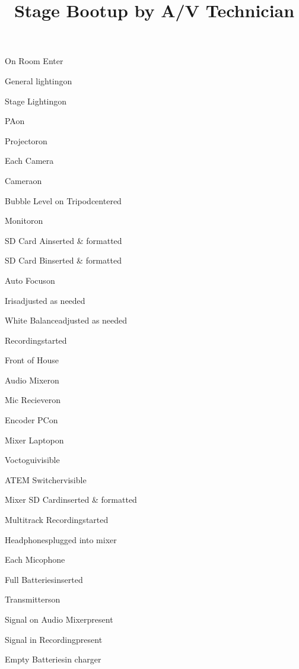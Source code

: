\def\papersize{4}




\title{Stage Bootup by A/V Technician}

\begin{checklist}{On Room Enter}
  \item{General lighting}{on}
  \item{Stage Lighting}{on}
  \item{PA}{on}
  \item{Projector}{on}
\end{checklist}

\begin{checklist}{Each Camera}
  \item{Camera}{on}
  \item{Bubble Level on Tripod}{centered}
  \item{Monitor}{on}
  \item{SD Card A}{inserted \& formatted}
  \item{SD Card B}{inserted \& formatted}
  \item{Auto Focus}{on}
  \item{Iris}{adjusted as needed}
  \item{White Balance}{adjusted as needed}
  \item{Recording}{started}
\end{checklist}

\begin{checklist}{Front of House}
  \item{Audio Mixer}{on}
  \item{Mic Reciever}{on}
  \item{Encoder PC}{on}
  \item{Mixer Laptop}{on}
  \item{Voctogui}{visible}
  \item{ATEM Switcher}{visible}
  \item{Mixer SD Card}{inserted \& formatted}
  \item{Multitrack Recording}{started}
  \item{Headphones}{plugged into mixer}
\end{checklist}

\begin{checklist}{Each Micophone}
  \item{Full Batteries}{inserted}
  \item{Transmitters}{on}
  \item{Signal on Audio Mixer}{present}
  \item{Signal in Recording}{present}
  \item{Empty Batteries}{in charger}
\end{checklist}

